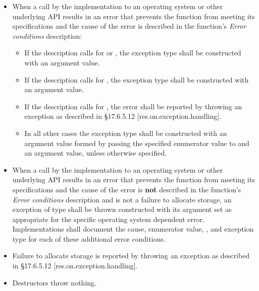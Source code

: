 \begin{itemize}
\item When a call by the implementation to an operating system or other underlying API results in an error that prevents the function from meeting its specifications and the cause of the error is described in the function's \textit{Error conditions} description:
	\begin{itemize}
		\item If the description calls for  or , the exception type shall be  constructed with an   argument value.
		\item If the description calls for , the exception type shall be  constructed with an   argument value.
		\item If the description calls for , the error shall be reported by throwing an exception as described in \CppXIV \S17.6.5.12 [res.on.exception.handling].
		\item In all other cases the exception type shall be  constructed with an  argument value formed by passing the specified enumerator value to  and an   argument value, unless otherwise specified.
	\end{itemize}

\item When a call by the implementation to an operating system or other underlying API results in an error that prevents the function from meeting its specifications and the cause of the error is \textbf{not} described in the function's \textit{Error conditions} description and is not a failure to allocate storage, an exception of type  shall be thrown constructed with its  argument set as appropriate for the specific operating system dependent error. Implementations shall document the cause, enumerator value, , and exception type for each of these additional error conditions.

\item Failure to allocate storage is reported by throwing an exception as described in \CppXIV \S17.6.5.12 [res.on.exception.handling].

\item Destructors throw nothing.
\end{itemize}

